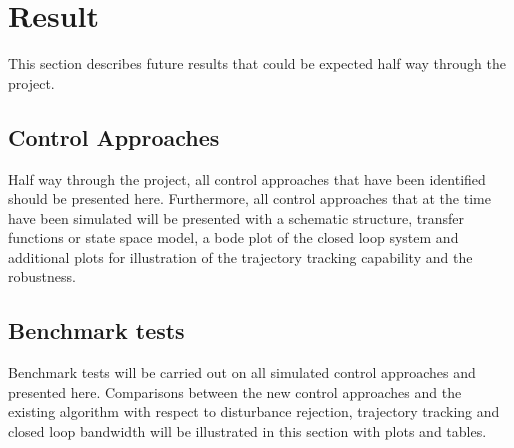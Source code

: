 \chapter{Result}\label{cha:result}
This section describes future results that could be expected half way through the project.

\section{Control Approaches}
Half way through the project, all control approaches that have been identified should be presented here. Furthermore, all control approaches that at the time have been simulated will be presented with a schematic structure, transfer functions or state space model, a bode plot of the closed loop system and additional plots for illustration of the trajectory tracking capability and the robustness.

\section{Benchmark tests}
Benchmark tests will be carried out on all simulated control approaches and presented here. Comparisons between the new control approaches and the existing algorithm with respect to disturbance rejection, trajectory tracking and closed loop bandwidth will be illustrated in this section with plots and tables.
